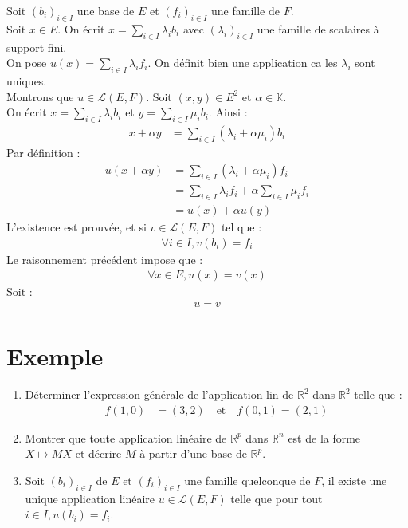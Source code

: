 \documentclass[../main.tex]{subfiles}
\begin{document}
\noindent Soit $(b_i)_{i\in I}$ une base de $E$ et $(f_i)_{i\in I}$ une famille de $F$. \\
Soit $x\in E$. On écrit $x = \sum\limits_{i\in I} \lambda_i b_i$ avec $(\lambda_i)_{i\in I}$ une famille de scalaires à support fini. \\
On pose $u(x) = \sum\limits_{i\in I} \lambda_i f_i$. On définit bien une application ca les $\lambda_i$ sont uniques. \\
Montrons que $u\in \mathcal{L}(E, F)$. Soit $(x, y) \in E^2$ et $\alpha \in \mathbb{K}$. \\
On écrit $x = \sum\limits_{i\in I} \lambda_i b_i$ et $y = \sum\limits_{i\in I} \mu_i b_i$. Ainsi : 
\begin{align*}
    x + \alpha y &= \sum_{i\in I} (\lambda_i + \alpha \mu_i) b_i
\end{align*}
Par définition : 
\begin{align*}
    u(x + \alpha y) &= \sum_{i\in I} (\lambda_i + \alpha \mu_i) f_i \\
    &= \sum_{i\in I} \lambda_i f_i + \alpha \sum_{i\in I} \mu_i f_i \\
    &= u(x) + \alpha u(y)
\end{align*}
L'existence est prouvée, et si $v\in \mathcal{L}(E, F)$ tel que : 
\begin{align*}
    \forall i \in I, v(b_i) = f_i
\end{align*}
Le raisonnement précédent impose que : 
\begin{align*}
    \forall x \in E, u(x) = v(x)
\end{align*}
Soit : 
\begin{align*}
    u = v
\end{align*}

\section{Exemple}
\begin{tcolorbox}[title=Exemple 21.64, title filled=false, colframe=darkgreen, colback=darkgreen!10!white]
    \begin{enumerate}
        \item Déterminer l'expression générale de l'application lin de $\mathbb{R}^2$ dans $\mathbb{R}^2$ telle que : 
        \begin{align*}
            f(1, 0) &= (3, 2) \quad \text{et} \quad f(0, 1) = (2, 1)
        \end{align*}

        \item Montrer que toute application linéaire de $\mathbb{R}^p$ dans $\mathbb{R}^n$ est de la forme $X\mapsto MX$ et décrire $M$ à partir d'une base de $\mathbb{R}^p$. 

        \item Soit $(b_i)_{i\in I}$ de $E$ et $(f_i)_{i\in I}$ une famille quelconque de $F$, il existe une unique application linéaire $u\in \mathcal{L}(E, F)$ telle que pour tout $i \in I, u(b_i) = f_i$.
    \end{enumerate}
\end{tcolorbox}
\end{document}
